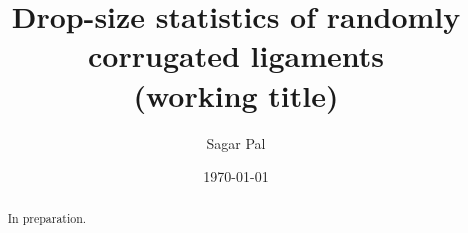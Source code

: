 \documentclass[11pt]{article}
\title{Drop-size statistics of randomly corrugated ligaments\\
  \large (working title)}
\author{Sagar Pal}
\date{\today}
\begin{document}
\maketitle

\begin{abstract}
In preparation.
\end{abstract}
\end{document}

